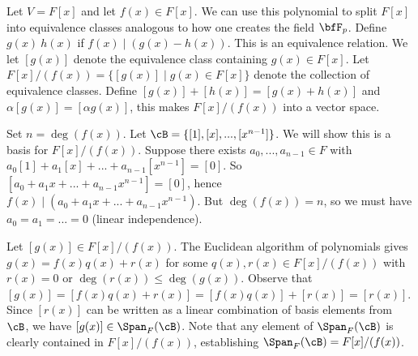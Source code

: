     \begin{example}
        Let $V = F[x]$ and let $f(x) \in F[x]$. We can use this polynomial to split $F[x]$ into equivalence classes analogous to how one creates the field $\bfF_p$. Define $g(x) ~ h(x)$ if $f(x) \mid (g(x) - h(x))$. This is an equivalence relation. We let $[g(x)]$ denote the equivalence class containing $g(x) \in F[x]$. Let $F[x]/(f(x)) = \{[g(x)] \mid g(x) \in F[x]\}$ denote the collection of equivalence classes. Define $[g(x)] + [h(x)] = [g(x) + h(x)]$ and $\alpha[g(x)] = [\alpha g(x)]$, this makes $F[x]/(f(x))$ into a vector space.

        Set $n = \deg{(f(x))}$. Let $\cB = \{[1],[x],...,[x^{n-1}]\}$. We will show this is a basis for $F[x]/(f(x))$. Suppose there exists $a_0,...,a_{n-1} \in F$ with $a_0[1] + a_1[x] + ... +a_{n-1}[x^{n-1}] = [0]$. So $[a_0 + a_1 x + ... + a_{n-1}x^{n-1}] = [0]$, hence $f(x) \mid (a_0 + a_1 x + ... + a_{n-1}x^{n-1})$. But $\deg{(f(x))} = n$, so we must have $a_0 = a_1 = ... = 0$ (linear independence).

        Let $[g(x)] \in F[x]/(f(x))$. The Euclidean algorithm of polynomials gives $g(x) = f(x)q(x) + r(x)$ for some $q(x),r(x) \in F[x]/(f(x))$ with $r(x) = 0$ or $\deg{(r(x))} \leq \deg{(g(x))}$. Observe that $[g(x)] = [f(x)q(x) + r(x)] = [f(x)q(x)] + [r(x)] = [r(x)]$. Since $[r(x)]$ can be written as a linear combination of basis elements from $\cB$, we have $[g(x)] \in \Span_F{(\cB)}$. Note that any element of $\Span_F{(\cB)}$ is clearly contained in $F[x]/(f(x))$, establishing $\Span_F{(\cB)} = F[x]/(f(x))$.
    \end{example}

